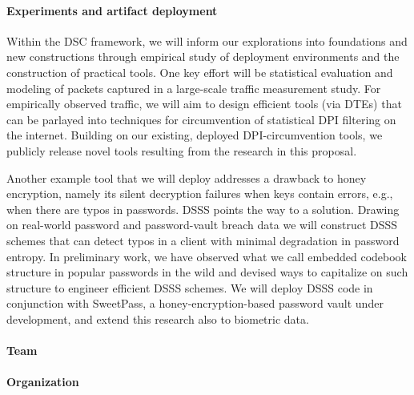 
\paragraph{Experiments and artifact deployment} Within the DSC framework, we will inform our explorations into foundations and new constructions through empirical study of deployment environments and the construction of practical tools. One key effort will be statistical evaluation and modeling of packets captured in a large-scale traffic measurement study. For empirically observed traffic, we will aim to design efficient tools (via DTEs) that can be parlayed into techniques for circumvention of statistical DPI filtering on the internet. Building on our existing, deployed DPI-circumvention tools, we publicly release novel tools resulting from the research in this proposal.

Another example tool that we will deploy addresses a drawback to honey encryption, namely its silent decryption failures when keys contain errors, e.g., when there are typos in passwords. DSSS points the way to a solution.
Drawing on real-world password and password-vault breach data we will construct DSSS schemes that can detect typos in a client with minimal degradation in password entropy. In preliminary work, we have observed what we call embedded codebook structure in popular passwords in the wild and devised ways to capitalize on such structure to engineer efficient DSSS schemes. We will deploy DSSS code in conjunction with SweetPass, a honey-encryption-based password vault under development, and extend this research also to biometric data. 


\paragraph{Team}


\paragraph{Organization}




